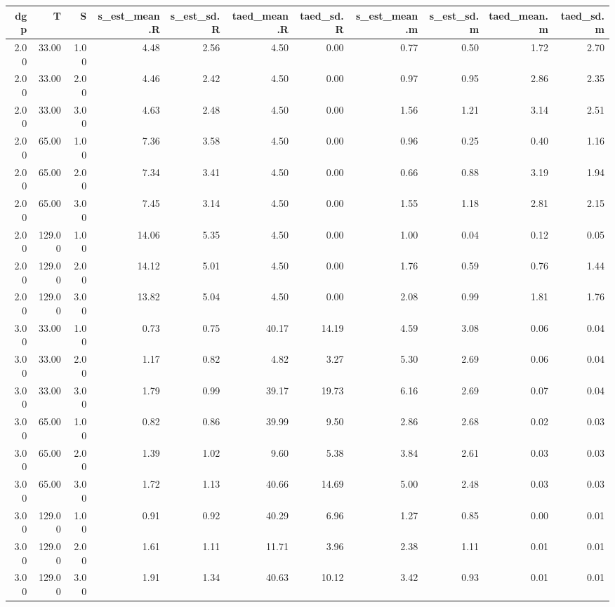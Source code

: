 \begin{table}[ht]
\centering
\begin{tabular}{rrrrrrrrrrr}
  \hline
dgp & T & S & s\_est\_mean.R & s\_est\_sd.R & taed\_mean.R & taed\_sd.R & s\_est\_mean.m & s\_est\_sd.m & taed\_mean.m & taed\_sd.m \\ 
  \hline
2.00 & 33.00 & 1.00 & 4.48 & 2.56 & 4.50 & 0.00 & 0.77 & 0.50 & 1.72 & 2.70 \\ 
  2.00 & 33.00 & 2.00 & 4.46 & 2.42 & 4.50 & 0.00 & 0.97 & 0.95 & 2.86 & 2.35 \\ 
  2.00 & 33.00 & 3.00 & 4.63 & 2.48 & 4.50 & 0.00 & 1.56 & 1.21 & 3.14 & 2.51 \\ 
  2.00 & 65.00 & 1.00 & 7.36 & 3.58 & 4.50 & 0.00 & 0.96 & 0.25 & 0.40 & 1.16 \\ 
  2.00 & 65.00 & 2.00 & 7.34 & 3.41 & 4.50 & 0.00 & 0.66 & 0.88 & 3.19 & 1.94 \\ 
  2.00 & 65.00 & 3.00 & 7.45 & 3.14 & 4.50 & 0.00 & 1.55 & 1.18 & 2.81 & 2.15 \\ 
  2.00 & 129.00 & 1.00 & 14.06 & 5.35 & 4.50 & 0.00 & 1.00 & 0.04 & 0.12 & 0.05 \\ 
  2.00 & 129.00 & 2.00 & 14.12 & 5.01 & 4.50 & 0.00 & 1.76 & 0.59 & 0.76 & 1.44 \\ 
  2.00 & 129.00 & 3.00 & 13.82 & 5.04 & 4.50 & 0.00 & 2.08 & 0.99 & 1.81 & 1.76 \\ 
  3.00 & 33.00 & 1.00 & 0.73 & 0.75 & 40.17 & 14.19 & 4.59 & 3.08 & 0.06 & 0.04 \\ 
  3.00 & 33.00 & 2.00 & 1.17 & 0.82 & 4.82 & 3.27 & 5.30 & 2.69 & 0.06 & 0.04 \\ 
  3.00 & 33.00 & 3.00 & 1.79 & 0.99 & 39.17 & 19.73 & 6.16 & 2.69 & 0.07 & 0.04 \\ 
  3.00 & 65.00 & 1.00 & 0.82 & 0.86 & 39.99 & 9.50 & 2.86 & 2.68 & 0.02 & 0.03 \\ 
  3.00 & 65.00 & 2.00 & 1.39 & 1.02 & 9.60 & 5.38 & 3.84 & 2.61 & 0.03 & 0.03 \\ 
  3.00 & 65.00 & 3.00 & 1.72 & 1.13 & 40.66 & 14.69 & 5.00 & 2.48 & 0.03 & 0.03 \\ 
  3.00 & 129.00 & 1.00 & 0.91 & 0.92 & 40.29 & 6.96 & 1.27 & 0.85 & 0.00 & 0.01 \\ 
  3.00 & 129.00 & 2.00 & 1.61 & 1.11 & 11.71 & 3.96 & 2.38 & 1.11 & 0.01 & 0.01 \\ 
  3.00 & 129.00 & 3.00 & 1.91 & 1.34 & 40.63 & 10.12 & 3.42 & 0.93 & 0.01 & 0.01 \\ 

\end{tabular}
\end{table}
